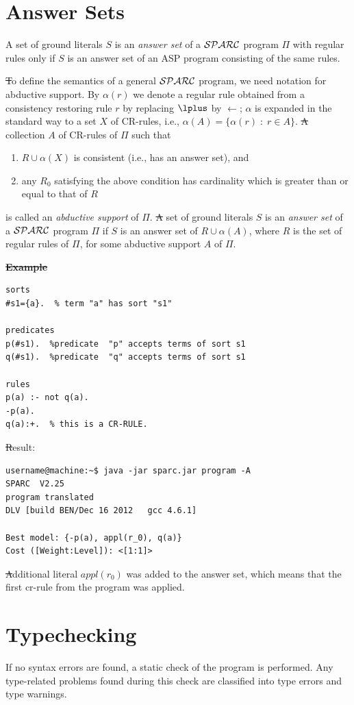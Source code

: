 \documentclass[12pt, letterpaper]{article}
\begin{document}
 
\section{Answer Sets}
\noindent A set of ground literals $S$ is an {\em answer set} of a ${\cal SPARC}$ 
program $\Pi$ with regular rules only if $S$ is an answer set of an ASP program consisting of the same rules.

\st To define the semantics of a general ${\cal SPARC}$ program, we need notation for abductive support.
By $\alpha(r)$ we denote a regular rule
obtained from a consistency restoring rule $r$
by replacing $\lplus$ by $\leftarrow$;
$\alpha$ is expanded in the standard way to a set $X$ of CR-rules,
i.e., $\alpha(A) = \{\alpha(r)\; :\; r \in A\}$.
\st A %
collection $A$ of CR-rules of $\Pi$ such that 
\begin{enumerate}
\item $R \cup \alpha(X)$ is consistent (i.e., has an answer set), and
\item any $R_0$ satisfying the above condition has cardinality
which is greater than or equal to that of $R$
\end{enumerate}
is called an {\em abductive support} of $\Pi$.
\st A set of ground literals $S$ is an {\em answer set} of a ${\cal SPARC}$ program 
$\Pi$ if $S$ is an answer set of $R \cup \alpha(A)$, where $R$ is the set of regular rules of $\Pi$, for some abductive
support $A$ of $\Pi$.

\st \textbf{Example}
\begin{verbatim}
sorts
#s1={a}.  % term "a" has sort "s1"

predicates
p(#s1).  %predicate  "p" accepts terms of sort s1 
q(#s1).  %predicate  "q" accepts terms of sort s1 

rules
p(a) :- not q(a).
-p(a).
q(a):+.  % this is a CR-RULE. 
\end{verbatim}
\st Result:
\begin{verbatim}
username@machine:~$ java -jar sparc.jar program -A
SPARC  V2.25
program translated
DLV [build BEN/Dec 16 2012   gcc 4.6.1]

Best model: {-p(a), appl(r_0), q(a)}
Cost ([Weight:Level]): <[1:1]>
\end{verbatim}

\st Additional literal $appl(r_0)$ was added to the answer set, which means that the 
first cr-rule from the program was applied.

\section{Typechecking}
If no syntax errors are found, a static check of the program is performed. Any type-related problems found during this check are classified into type errors and type warnings.
\end{document}
